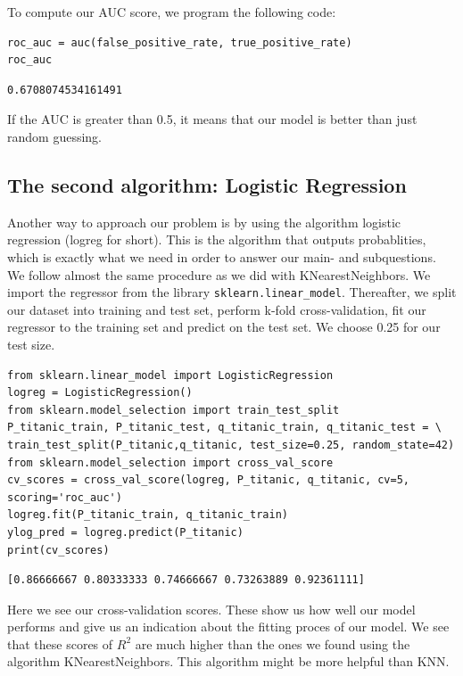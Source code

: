 \documentclass[11pt]{article}
\begin{document}
To compute our AUC score, we program the following code: 
\begin{verbatim}
roc_auc = auc(false_positive_rate, true_positive_rate)
roc_auc
\end{verbatim}

\begin{verbatim}
0.6708074534161491
\end{verbatim}

If the AUC is greater than 0.5, it means that our model is better than just random guessing. 

\newpage
\subsection{The second algorithm: Logistic Regression}
\label{sec:org8a1d085}

Another way to approach our problem is by using the algorithm logistic regression (logreg for short). This is the algorithm that outputs probablities, which is exactly what we need in order to answer our main- and subquestions. We follow almost the same procedure as we did with KNearestNeighbors. We import the regressor from the library \texttt{sklearn.linear\_model}. Thereafter, we split our dataset into training and test set, perform k-fold cross-validation, fit our regressor to the training set and predict on the test set. We choose 0.25 for our test size. 

\begin{verbatim}
from sklearn.linear_model import LogisticRegression
logreg = LogisticRegression()
from sklearn.model_selection import train_test_split
P_titanic_train, P_titanic_test, q_titanic_train, q_titanic_test = \
train_test_split(P_titanic,q_titanic, test_size=0.25, random_state=42)
from sklearn.model_selection import cross_val_score
cv_scores = cross_val_score(logreg, P_titanic, q_titanic, cv=5, scoring='roc_auc')
logreg.fit(P_titanic_train, q_titanic_train)
ylog_pred = logreg.predict(P_titanic)
print(cv_scores)
\end{verbatim}

\begin{verbatim}
[0.86666667 0.80333333 0.74666667 0.73263889 0.92361111]

\end{verbatim}

Here we see our cross-validation scores. These show us how well our model performs and give us an indication about the fitting proces of our model. We see that these scores of \(R^{2}\) are much higher than the ones we found using the algorithm KNearestNeighbors. This algorithm might be more helpful than KNN. 
\end{document}
